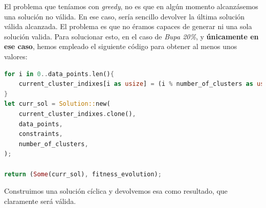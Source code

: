 \documentclass[11pt]{article}
\begin{document}
El problema que teníamos con \emph{greedy}, no es que en algún momento alcanzásemos una solución no válida. En ese caso, sería sencillo devolver la última solución válida alcanzada. El problema es que no éramos capaces de generar ni una sola solución valida. Para solucionar esto, en el caso de \emph{Bupa 20\%}, y \textbf{únicamente en ese caso}, hemos empleado el siguiente código para obtener al menos unos valores:


\begin{lstlisting}[language=Rust, style=Boxed]
for i in 0..data_points.len(){
    current_cluster_indixes[i as usize] = (i % number_of_clusters as usize) as u32;
}
let curr_sol = Solution::new(
    current_cluster_indixes.clone(),
    data_points,
    constraints,
    number_of_clusters,
);

return (Some(curr_sol), fitness_evolution);
\end{lstlisting}

Construimos una solución cíclica y devolvemos esa como resultado, que claramente será válida.
\end{document}
